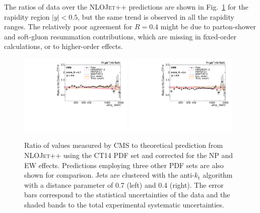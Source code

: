 \documentclass{PoS}
\providecommand{\NLOJETPP} {{\textsc{NLOJet++}}\xspace}
\providecommand{\kts}{\ensuremath{k_{\mathrm{t}}}\xspace}
\begin{document}
The ratios of data over the \NLOJETPP predictions are shown in Fig.~\ref{fig:ratio_CT14} for the rapidity region
$|y|<0.5$, but the same trend is observed in all the rapidity ranges. The relatively poor agreement for $R = 0.4$ might
be due to parton-shower and soft-gluon resummation contributions, which are missing in fixed-order calculations, or to
higher-order effects. 
\begin{figure}[htbp]
  \includegraphics[width=0.48\textwidth]{Figure2-a.pdf}
  \includegraphics[width=0.48\textwidth]{Figure2-b.pdf}
  \caption{Ratio of values measured by CMS to theoretical prediction from \NLOJETPP using the CT14 PDF set and corrected for
the NP and EW effects. Predictions employing three other PDF sets are also shown for comparison. Jets are
clustered with the anti-\kts algorithm with a distance parameter of
0.7 (left) and 0.4 (right). The error bars correspond to the statistical
uncertainties of the data and the shaded bands to the total experimental systematic uncertainties.}
  \label{fig:ratio_CT14}
\end{figure}
\end{document}
